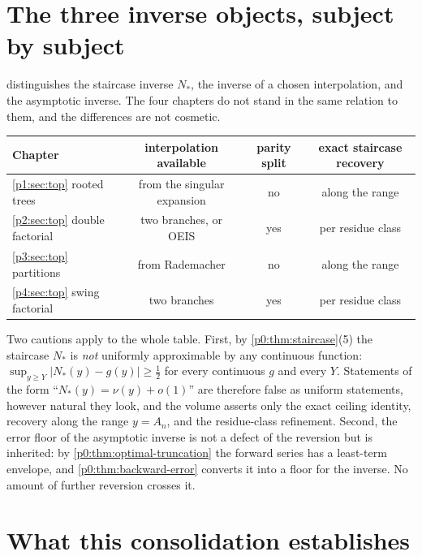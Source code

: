 \documentclass[11pt,a4paper,oneside]{book}
\theoremstyle{plain}
\theoremstyle{definition}
\theoremstyle{remark}
\newcommand{\littleo}{o}
\begin{document}
\section{The three inverse objects, subject by subject}
\label{p5:sec:three-objects}

 distinguishes the staircase inverse $N_\ast$, the
inverse of a chosen interpolation, and the asymptotic inverse.  The four
chapters do not stand in the same relation to them, and the differences are
not cosmetic.

\begin{center}
\small
\begin{tabular}{@{}lccc@{}}
\toprule
Chapter & interpolation available & parity split & exact staircase recovery \\
\midrule
\ref{p1:sec:top} rooted trees & from the singular expansion & no & along the range \\
\ref{p2:sec:top} double factorial & two branches, or OEIS & yes & per residue class \\
\ref{p3:sec:top} partitions & from Rademacher & no & along the range \\
\ref{p4:sec:top} swing factorial & two branches & yes & per residue class \\
\bottomrule
\end{tabular}
\end{center}

Two cautions apply to the whole table.  First, by \cref{p0:thm:staircase}(5)
the staircase $N_\ast$ is \emph{not} uniformly approximable by any continuous
function: $\sup_{y\ge Y}\lvert N_\ast(y)-g(y)\rvert\ge\tfrac12$ for every
continuous $g$ and every $Y$.  Statements of the form ``$N_\ast(y)=\nu(y)+
\littleo(1)$'' are therefore false as uniform statements, however natural they
look, and the volume asserts only the exact ceiling identity, recovery along
the range $y=A_n$, and the residue-class refinement.  Second, the error floor
of the asymptotic inverse is not a defect of the reversion but is inherited:
by \cref{p0:thm:optimal-truncation} the forward series has a least-term
envelope, and \cref{p0:thm:backward-error} converts it into a floor for the
inverse.  No amount of further reversion crosses it.

\section{What this consolidation establishes}\label{p5:sec:new}
\end{document}

